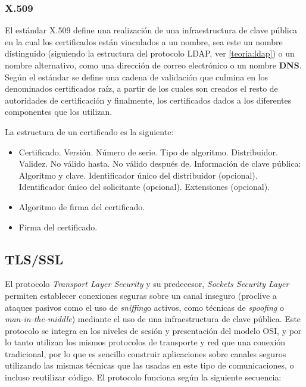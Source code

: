 \subsubsection{X.509}

El estándar X.509\label{rfc4158} define una realización de una infraestructura de clave pública en la cual los certificados están vinculados a un nombre, sea este un nombre distinguido (siguiendo la estructura del protocolo LDAP, ver \ref{teoria:ldap}) o un nombre alternativo, como una dirección de correo electrónico o un nombre \textbf{DNS}. Según el estándar se define una cadena de validación que culmina en los denominados certificados raíz, a partir de los cuales son creados el resto de autoridades de certificación y finalmente, los certificados dados a los diferentes componentes que los utilizan.

La estructura de un certificado es la siguiente\label{rfc5280}:

\begin{itemize}
  \item Certificado.
    \subitem Versión.
    \subitem Número de serie.
    \subitem Tipo de algoritmo.
    \subitem Distribuidor.
    \subitem Validez.
      \subsubitem No válido hasta.
      \subsubitem No válido después de.
    \subitem Información de clave pública: Algoritmo y clave.
    \subitem Identificador único del distribuidor (opcional).
    \subitem Identificador único del solicitante (opcional).
    \subitem Extensiones (opcional).
  \item Algoritmo de firma del certificado.
  \item Firma del certificado.
\end{itemize}

\subsection{TLS/SSL}
El protocolo \textit{Transport Layer Security}\cite{rfc5246} y su predecesor, \textit{Sockets Security Layer} permiten establecer conexiones seguras sobre un canal inseguro (proclive a ataques pasivos como el uso de \textit{sniffing}\citationneeded o activos, como técnicas de \textit{spoofing} o \textit{man-in-the-middle}\citationneeded) mediante el uso de una infraestructura de clave pública. Este protocolo se integra en los niveles de sesión y presentación del modelo OSI, y por lo tanto utilizan los mismos protocolos de transporte y red que una conexión tradicional, por lo que es sencillo construir aplicaciones sobre canales seguros utilizando las mismas técnicas que las usadas en este tipo de comunicaciones, o incluso reutilizar código. El protocolo funciona según la siguiente secuencia:


